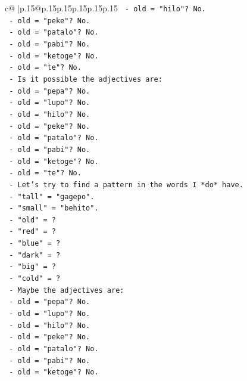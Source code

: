 \documentclass{article}
\begin{document}
{\begin{supertabular}{c@{$\;$}|p{.15\linewidth}@{}p{.15\linewidth}p{.15\linewidth}p{.15\linewidth}p{.15\linewidth}p{.15\linewidth}}
{{{\texttt{        {-} old = "hilo"? No.} \\
\texttt{        {-} old = "peke"? No.} \\
\texttt{        {-} old = "patalo"? No.} \\
\texttt{        {-} old = "pabi"? No.} \\
\texttt{        {-} old = "ketoge"? No.} \\
\texttt{        {-} old = "te"? No.} \\
\texttt{      {-} Is it possible the adjectives are:} \\
\texttt{        {-} old = "pepa"? No.} \\
\texttt{        {-} old = "lupo"? No.} \\
\texttt{        {-} old = "hilo"? No.} \\
\texttt{        {-} old = "peke"? No.} \\
\texttt{        {-} old = "patalo"? No.} \\
\texttt{        {-} old = "pabi"? No.} \\
\texttt{        {-} old = "ketoge"? No.} \\
\texttt{        {-} old = "te"? No.} \\
\texttt{      {-} Let's try to find a pattern in the words I *do* have.} \\
\texttt{      {-} "tall" = "gagepo".} \\
\texttt{      {-} "small" = "behito".} \\
\texttt{      {-} "old" = ?} \\
\texttt{      {-} "red" = ?} \\
\texttt{      {-} "blue" = ?} \\
\texttt{      {-} "dark" = ?} \\
\texttt{      {-} "big" = ?} \\
\texttt{      {-} "cold" = ?} \\
\texttt{      {-} Maybe the adjectives are:} \\
\texttt{        {-} old = "pepa"? No.} \\
\texttt{        {-} old = "lupo"? No.} \\
\texttt{        {-} old = "hilo"? No.} \\
\texttt{        {-} old = "peke"? No.} \\
\texttt{        {-} old = "patalo"? No.} \\
\texttt{        {-} old = "pabi"? No.} \\
\texttt{        {-} old = "ketoge"? No.} \\
}}}
\end{supertabular}}
\end{document}
